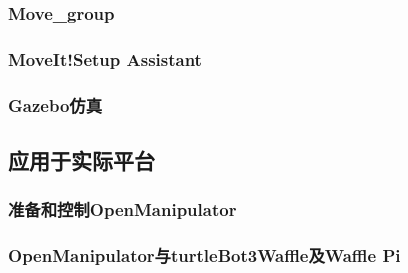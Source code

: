 \documentclass[geye,green,kindle,cn]{elegantnote}
\begin{document}
\subsubsection{Move\_group}
\subsubsection{MoveIt!Setup Assistant}
\subsubsection{Gazebo仿真}
\subsection{应用于实际平台}
\subsubsection{准备和控制OpenManipulator}
\subsubsection{OpenManipulator与turtleBot3Waffle及Waffle Pi}
\end{document}

